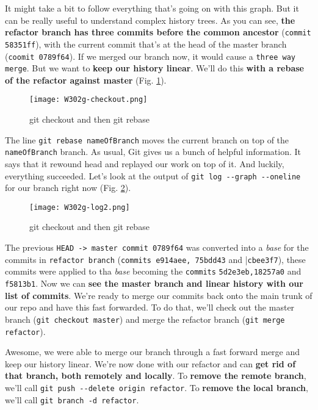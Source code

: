 It might take a bit to follow everything that's going on with this graph. But it can be really useful to understand complex history trees. As you can see, \textbf{the refactor branch has three commits before the common ancestor} (\verb|commit 58351ff|), with the current commit that's at the head of the master branch (\verb|coomit 0789f64|). If we merged our branch now, it would cause a \verb|three way merge|. But we want to \textbf{keep our history linear}. We'll do this \textbf{with a rebase of the refactor against master} (Fig. \ref{W302g-checkout}).

\begin{figure} 
	\caption{git checkout and then git rebase}
	\centering
	\texttt{[image: W302g-checkout.png]}
	\label{W302g-checkout}
\end{figure}

The line \verb|git rebase nameOfBranch| moves the current branch on top of the \verb|nameOfBranch| branch.
As usual, Git gives us a bunch of helpful information. It says that it rewound head and replayed our work on top of it. And luckily, everything succeeded. Let's look at the output of \verb|git log --graph --oneline| for our branch right now (Fig. \ref{W302g-log2}).

\begin{figure} 
	\caption{git checkout and then git rebase}
	\centering
	\texttt{[image: W302g-log2.png]}
	\label{W302g-log2}
\end{figure}

The previous \verb|HEAD -> master commit 0789f64| was converted into a \textit{base} for the commits in \verb|refactor branch| (\verb|commits e914aee, 75bdd43| and |\verb|cbee3f7|), these commits were applied to tha \textit{base} becoming the \verb|commits| \verb|5d2e3eb,18257a0| and \verb|f5813b1|.
Now we can \textbf{see the master branch and linear history with our list of commits}. We're ready to merge our commits back onto the main trunk of our repo and have this fast forwarded. To do that, we'll check out the master branch (\verb|git checkout master|) and merge the refactor branch (\verb|git merge refactor|).

Awesome, we were able to merge our branch through a fast forward merge and keep our history linear. We're now done with our refactor and can \textbf{get rid of that branch, both remotely and locally}. To \textbf{remove the remote branch}, we'll call \verb|git push --delete origin refactor|. To \textbf{remove the local branch}, we'll call \verb|git branch -d refactor|.

